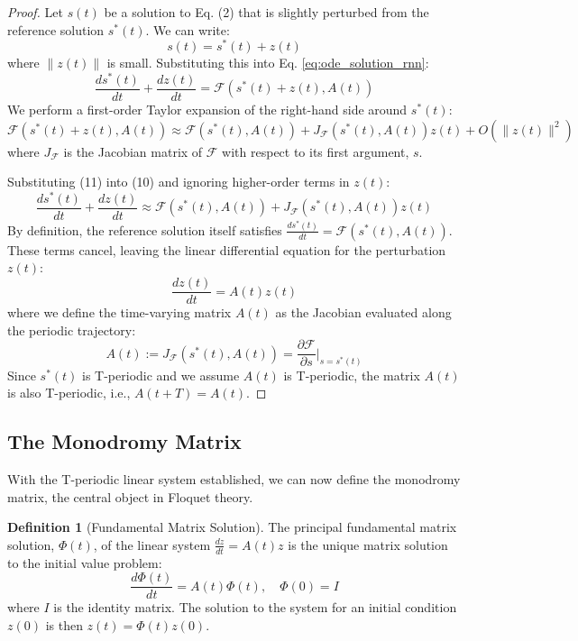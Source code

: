 \documentclass{article}
\theoremstyle{remark}
\theoremstyle{definition}
\newtheorem{definition}{Definition}
\newcommand{\dpt}[1]{\frac{d#1}{dt}} %
\begin{document}
\begin{proof}
Let $s(t)$ be a solution to Eq. (2) that is slightly perturbed from the reference solution $s^*(t)$. We can write:
\begin{equation}
    s(t) = s^*(t) + z(t)
\end{equation}
where $\|z(t)\|$ is small. Substituting this into Eq. \ref{eq:ode_solution_rnn}:
\begin{equation}
    \dpt{s^*(t)} + \dpt{z(t)} = \mathcal{F}(s^*(t) + z(t), A(t))
\end{equation}
We perform a first-order Taylor expansion of the right-hand side around $s^*(t)$:
\begin{equation}
    \mathcal{F}(s^*(t) + z(t), A(t)) \approx \mathcal{F}(s^*(t), A(t)) + J_{\mathcal{F}}(s^*(t), A(t)) z(t) + O(\|z(t)\|^2)
\end{equation}
where $J_{\mathcal{F}}$ is the Jacobian matrix of $\mathcal{F}$ with respect to its first argument, $s$.

Substituting (11) into (10) and ignoring higher-order terms in $z(t)$:
\begin{equation}
    \dpt{s^*(t)} + \dpt{z(t)} \approx \mathcal{F}(s^*(t), A(t)) + J_{\mathcal{F}}(s^*(t), A(t)) z(t)
\end{equation}
By definition, the reference solution itself satisfies $\dpt{s^*(t)} = \mathcal{F}(s^*(t), A(t))$. These terms cancel, leaving the linear differential equation for the perturbation $z(t)$:
\begin{equation}
    \dpt{z(t)} = A(t) z(t)
\end{equation}
where we define the time-varying matrix $A(t)$ as the Jacobian evaluated along the periodic trajectory:
\begin{equation}
    A(t) := J_{\mathcal{F}}(s^*(t), A(t)) = \frac{\partial \mathcal{F}}{\partial s} \bigg|_{s=s^*(t)}
\end{equation}
Since $s^*(t)$ is T-periodic and we assume $A(t)$ is T-periodic, the matrix $A(t)$ is also T-periodic, i.e., $A(t+T) = A(t)$.
\end{proof}

\subsection{The Monodromy Matrix} \label{seq:step3}
With the T-periodic linear system established, we can now define the monodromy matrix, the central object in Floquet theory.

\begin{definition}[Fundamental Matrix Solution]
The principal fundamental matrix solution, $\Phi(t)$, of the linear system $\dpt{z} = A(t)z$ is the unique matrix solution to the initial value problem:
\begin{equation}
    \dpt{\Phi(t)} = A(t)\Phi(t), \quad \Phi(0) = I
\end{equation}
where $I$ is the identity matrix. The solution to the system for an initial condition $z(0)$ is then $z(t) = \Phi(t)z(0)$.
\end{definition}
\end{document}
